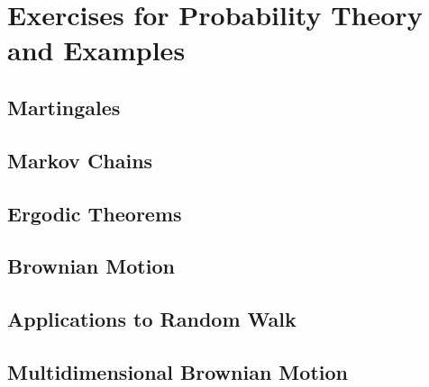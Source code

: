 \chapter{Exercises for Probability Theory and Examples}

\section{Martingales}

\section{Markov Chains}

\section{Ergodic Theorems}

\section{Brownian Motion}

\section{Applications to Random Walk}

\section{Multidimensional Brownian Motion}
